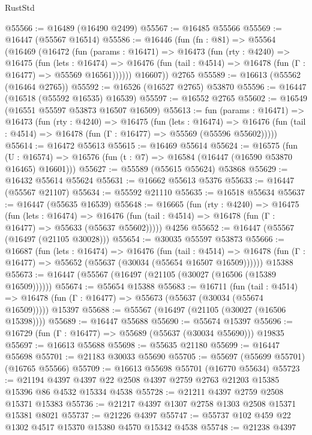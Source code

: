 \begin{lexlean}{RustStd}
\begin{coremodule}
{\begin{coremodule}
{{{{{{{{{{{{{{{{{{{{{{{{{{{{{{{{{{{{{{{{{{{{{{{{{{{{{{{@55566 := @16489 (@16490 @2499)
@55567 := @16485 @55566
@55569 := @16447 (@55567 @16514)
@55586 := @16446
    (fun (fn : @81) =>
    @55564
      (@16469
        (@16472
          (fun (params : @16471) =>
          @16473
            (fun (rty : @4240) =>
            @16475
              (fun (lets : @16474) =>
              @16476 (fun (tail : @4514) => @16478 (fun (Γ : @16477) => @55569 @16561))))))
        @16607))
    @2765
@55589 := @16613 (@55562 (@16464 @2765))
@55592 := @16526 (@16527 @2765) @53870
@55596 := @16447 (@16518 (@55592 @16535) @16539)
@55597 := @16552 @2765
@55602 := @16549 (@16551 @55597 @53873 @16507 @16509)
@55613 := fun (params : @16471) =>
  @16473
    (fun (rty : @4240) =>
    @16475
      (fun (lets : @16474) =>
      @16476 (fun (tail : @4514) => @16478 (fun (Γ : @16477) => @55569 (@55596 @55602)))))
@55614 := @16472 @55613
@55615 := @16469 @55614
@55624 := @16575
    (fun (U : @16574) => @16576 (fun (t : @7) => @16584 (@16447 (@16590 @53870 @16465) @16601)))
@55627 := @55589 (@55615 @55624) @53868
@55629 := @16432 @55614 @55624
@55631 := @16662 @55613 @5376
@55633 := @16447 (@55567 @21107)
@55634 := @55592 @21110
@55635 := @16518 @55634
@55637 := @16447 (@55635 @16539)
@55648 := @16665
    (fun (rty : @4240) =>
    @16475
      (fun (lets : @16474) =>
      @16476 (fun (tail : @4514) => @16478 (fun (Γ : @16477) => @55633 (@55637 @55602)))))
    @4256
@55652 := @16447 (@55567 (@16497 (@21105 @30028)))
@55654 := @30035 @55597 @53873
@55666 := @16687
    (fun (lets : @16474) =>
    @16476
      (fun (tail : @4514) =>
      @16478 (fun (Γ : @16477) => @55652 (@55637 (@30034 (@55654 @16507 @16509))))))
    @15388
@55673 := @16447 (@55567 (@16497 (@21105 (@30027 (@16506 (@15389 @16509))))))
@55674 := @55654 @15388
@55683 := @16711
    (fun (tail : @4514) => @16478 (fun (Γ : @16477) => @55673 (@55637 (@30034 (@55674 @16509)))))
    @15397
@55688 := @55567 (@16497 (@21105 (@30027 (@16506 @15398))))
@55689 := @16447 @55688
@55690 := @55674 @15397
@55696 := @16729 (fun (Γ : @16477) => @55689 (@55637 (@30034 @55690))) @19835
@55697 := @16613 @55688
@55698 := @55635 @21180
@55699 := @16447 @55698
@55701 := @21183 @30033 @55690
@55705 := @55697 (@55699 @55701) (@16765 @55566)
@55709 := @16613 @55698 @55701 (@16770 @55634)
@55723 := @21194 @4397 @4397 @22 @2508 @4397 @2759 @2763 @21203 @15385 @15396 @86 @4532 @15334 @4538
@55728 := @21211 @4397 @2759 @2508 @15371 @15383
@55736 := @21217 @4397 @1307 @2758 @1303 @2508 @15371 @15381 @8021
@55737 := @21226 @4397
@55747 := @55737 @102 @459 @22 @1302 @4517 @15370 @15380 @4570 @15342 @4538
@55748 := @21238 @4397
}}}}}}}}}}}}}}}}}}}}}}}}}}}}}}}}}}}}}}}}}}}}}}}}}}}}}}}
\end{coremodule}}
\end{coremodule}
\end{lexlean}
